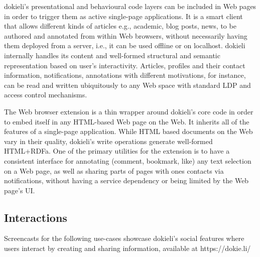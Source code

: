 \documentclass[a4paper]{llncs}
\begin{document}
                                    
\par dokieli’s presentational and behavioural code layers can be included in Web pages in order to trigger them as active single-page applications. It is a smart client that allows different kinds of articles e.g., academic, blog posts, news, to be authored and annotated from within Web browsers, without necessarily having them deployed from a server, i.e., it can be used offline or on localhost. dokieli internally handles its content and well-formed structural and semantic representation based on user’s interactivity. Articles, profiles and their contact information, notifications, annotations with different motivations, for instance, can be read and written ubiquitously to any Web space with standard LDP and access control mechanisms.

                                    
\par The Web browser extension is a thin wrapper around dokieli’s core code in order to embed itself in any HTML-based Web page on the Web. It inherits all of the features of a single-page application. While HTML based documents on the Web vary in their quality, dokieli’s write operations generate well-formed HTML+RDFa. One of the primary utilities for the extension is to have a consistent interface for annotating (comment, bookmark, like) any text selection on a Web page, as well as sharing parts of pages with ones contacts via notifications, without having a service dependency or being limited by the Web page’s UI.
                                
                            

                            
                                \subsection{Interactions}
  \label{interactions}

                                
                                    
\par Screencasts for the following use-cases showcase dokieli’s social features where users interact by creating and sharing information, available at https://dokie.li/

                                    
                                    
                                        
                                            
\end{document}
